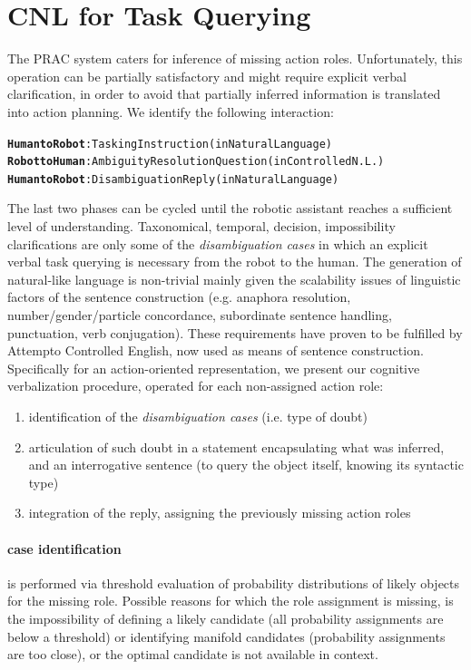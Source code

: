 \documentclass[oribibl]{llncs}
\begin{document}
\section{CNL for Task Querying}
The PRAC system caters for inference of missing action roles. 
Unfortunately, this operation can be partially satisfactory and 
might require explicit verbal clarification, in order to avoid 
that partially inferred information is translated into action planning.
We identify the following interaction:
{\small
\begin{alltt}
\textbf{\color{Red}Human to Robot} : Tasking Instruction           \hfill (in Natural Language)
\textbf{\color{Blue}Robot to Human} : Ambiguity Resolution Question\hfill (in Controlled N. L.)
\textbf{\color{Red}Human to Robot} : Disambiguation Reply          \hfill (in Natural Language)
\end{alltt}
}
The last two phases can be cycled until the robotic assistant reaches a sufficient level of understanding. 
Taxonomical, temporal, decision, impossibility clarifications are only some of the \textit{disambiguation cases} in which an explicit verbal task querying is necessary from the robot to the human. 
The generation of natural-like language is non-trivial mainly given the scalability issues of linguistic factors of the sentence construction (e.g. anaphora resolution, number/gender/particle concordance, subordinate sentence handling, punctuation, verb conjugation). These requirements have proven to be fulfilled by Attempto Controlled English, now used as means of sentence construction.\\
Specifically for an action-oriented representation, we present our cognitive verbalization procedure, operated for each non-assigned action role:

\begin{enumerate} %
    \item identification of the \textit{disambiguation cases}  (i.e. type of doubt)\\
    \item articulation of such doubt in a statement encapsulating what was inferred, and an interrogative sentence (to query the object itself, knowing its syntactic type) \\ 
    \item integration of the reply, assigning the previously missing action roles 
\end{enumerate}

\paragraph{case identification} is performed via threshold evaluation of probability distributions of likely objects for the missing role. 
Possible reasons for which the role assignment is missing, is the impossibility of 
defining a likely candidate (all probability assignments are below a threshold) or identifying manifold candidates (probability assignments are too close), or
the optimal candidate is not available in context.  
\end{document}
